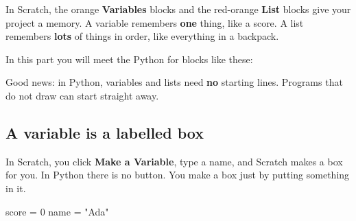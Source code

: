 
In Scratch, the orange \textbf{Variables} blocks and the red-orange \textbf{List} blocks give your project a memory. A variable remembers \textbf{one} thing, like a score. A list remembers \textbf{lots} of things in order, like everything in a backpack.

In this part you will meet the Python for blocks like these:

 \quad {} \quad {}

 \quad {}

 \quad {}

Good news: in Python, variables and lists need \textbf{no} starting lines. Programs that do not draw can start straight away.

\subsection*{A variable is a labelled box}

In Scratch, you click \textbf{Make a Variable}, type a name, and Scratch makes a box for you. In Python there is no button. You make a box just by putting something in it.

\begin{tcbraster}[raster columns=2, raster equal height=rows, raster column skip=12pt, raster valign=center]
\begin{tcolorbox}[colback=white, colframe=white, boxrule=0pt, valign=center]
\begin{scratch}
\end{scratch}
\end{tcolorbox}
\begin{code}
score = 0
name = "Ada"
\end{code}
\end{tcbraster}

